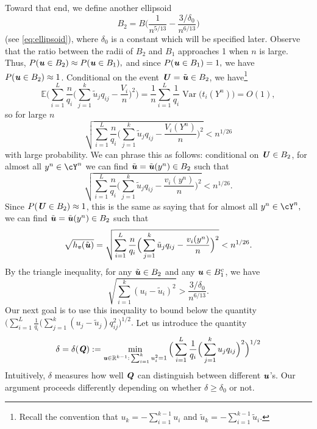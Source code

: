\documentclass[11pt,onecolumn]{IEEEtran}
\def\mathbi#1{{\textbf{\textit #1}}}
\DeclareMathOperator{\Var}{Var}
\begin{document}
Toward that end, we define another ellipsoid
   \begin{equation}\label{eq:B2}
B_2=B\Big( \frac{1}{n^{5/13}} - \frac{3/\delta_0}{n^{6/13}} \Big)
   \end{equation}
(see \eqref{eq:ellipsoid}), where $\delta_0$ is a constant which will be specified later.
Observe that the ratio between the radii of $B_2$ and $B_1$ approaches 1 when $n$ is large. Thus, 
$P(\mathbi{u} \in B_2)\approx P(\mathbi{u} \in B_1),$ and since $P(\mathbi{u}\in B_1)=1,$ we have $P(\mathbi{u} \in B_2)\approx 1$.
Conditional on the event $\mathbi{U} = \tilde{\mathbi{u}} \in B_2$, we have\footnote{Recall the convention that $u_k=-\sum_{i=1}^{k-1}u_i$ and $\tilde{u}_k=-\sum_{i=1}^{k-1} \tilde{u}_i$.} 
   $$
\mathbb{E}\Big(\sum_{i=1}^L \frac{n}{q_i} \Big(\sum_{j=1}^k \tilde{u}_j q_{ij} - \frac{V_i}{n} \Big)^2 \Big)  = \frac{1}{n} \sum_{i=1}^L \frac{1}{q_i} \Var\Big(t_i(Y^n) \Big) = O(1),
   $$
so for large $n$
   $$
\sqrt{\sum_{i=1}^L \frac{n}{q_i} \Big(\sum_{j=1}^k \tilde{u}_j q_{ij} - \frac{V_i(Y^n)}{n} \Big)^2 }
<  n^{1/26}
$$
with large probability.
We can phrase this as follows: conditional on $\mathbi{U} \in B_2$, for almost all $y^n\in\cY^n$  we can find $\tilde{\mathbi{u}} =\tilde{\mathbi{u}}(y^n) \in B_2$ such that
   $$
\sqrt{\sum_{i=1}^L \frac{n}{q_i} \Big(\sum_{j=1}^k \tilde{u}_j q_{ij} - \frac{v_i(y^n)}{n} \Big)^2 }
<  n^{1/26}.
   $$
Since $P(\mathbi{U} \in B_2)\approx 1$, this is the same as saying that for almost all $y^n\in\cY^n,$  we can find $\tilde{\mathbi{u}} =\tilde{\mathbi{u}}(y^n) \in B_2$ such that
\begin{equation}\label{eq:spl1}
\sqrt{h_{\mathbi{v}}(\tilde{\mathbi{u}})} 
= \sqrt{\sum_{i=1}^L \frac{n}{q_i} \Big(\sum_{j=1}^k \tilde{u}_j q_{ij} - \frac{v_i(y^n)}{n} \Big)^2 }
<  n^{1/26}.
\end{equation}
By the triangle inequality, for any $\tilde{\mathbi{u}} \in B_2$ and any $\mathbi{u}\in B_1^c$, we have 
\begin{equation}\label{eq:skt1}
\sqrt{\sum_{i=1}^k (u_i - \tilde{u}_i)^2} > \frac{3/\delta_0}{n^{6/13}}.
\end{equation}
Our next goal is to use this inequality to bound below the quantity $\big(\sum_{i=1}^L \frac{1}{q_i} 
(\sum_{j=1}^k (u_j - \tilde{u}_j) q_{ij} ^2\big)^{1/2}.$ Let us introduce the quantity
  \begin{equation}\label{eq:skt2}
\delta=\delta(\mathbi{Q}) := \min_{{\mathbi{u}\in\mathbb{R}^{k-1}:\, \sum_{i=1}^k u_i^2=1}}
\Big(\sum_{i=1}^L \frac{1}{q_i} \Big(\sum_{j=1}^k u_j q_{ij} \Big)^2\Big)^{1/2}
  \end{equation}
Intuitively, $\delta$ measures how well $\mathbi{Q}$ can distinguish between different $\mathbi{u}$'s. 
Our argument proceeds differently depending on whether $\delta\ge \delta_0$ or not.
\end{document}
